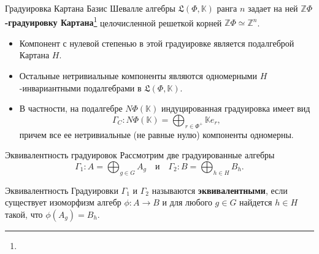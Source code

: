 \documentclass[12pt,aspectratio=169]{beamer}
\DeclareMathOperator{\Ann}{Ann}
\newcommand{\K}{\mathbb{K}}
\newcommand{\quot}[2]{#1\mathbin{/}#2}
\newcommand{\term}[1]{{\color{MainRed}\bfseries #1}}
\newcommand{\sourcefootnote}[1]{\footnote{\slidecite{#1}}}
\begin{document}
\begin{frame}[t]{Градуировка Картана}
    \small
    Базис Шевалле алгебры $\mathfrak{L}(\Phi,\K)$ ранга $n$ задает на ней
    \term{$\mathbb Z\Phi$-градуировку
        Картана}\sourcefootnote{kochetov2013,moody95} целочисленной решеткой корней
    $\mathbb Z\Phi\simeq \mathbb Z^n$.

    \begin{itemize}
        \item Компонент с нулевой степенью в этой градуировке является подалгеброй Картана
              $H$.
        \item Остальные нетривиальные компоненты являются одномерными $H$-инвариантными
              подалгебрами в $\mathfrak L(\Phi,\K)$.
        \item В частности, на подалгебре $N\Phi(\K)$ индуцированная градуировка имеет вид
              \[
                  \Gamma_C\colon N\Phi(\K)=\bigoplus_{r\in\Phi^+}\K e_r,
              \]
              причем все ее нетривиальные (не равные нулю) компоненты одномерны.
    \end{itemize}
\end{frame}

\begin{frame}[t]{Эквивалентность градуировок}
    Рассмотрим две градуированные алгебры
    \begin{equation}\label{eq:two-graded-algebras}
        \Gamma_1 \colon A = \bigoplus_{g \in G}A_g
        \quad \text{и} \quad
        \Gamma_2 \colon B = \bigoplus_{h \in H}B_h.
    \end{equation}
    \begin{block}{Эквивалентность}
        Градуировки $\Gamma_1$ и $\Gamma_2$ называются \term{эквивалентными},
        если существует изоморфизм алгебр $\phi\colon A\to B$ и для любого $g \in G$
        найдется $h \in H$ такой, что $\phi(A_g)=B_h$.
    \end{block}
\end{frame}

\end{document}
